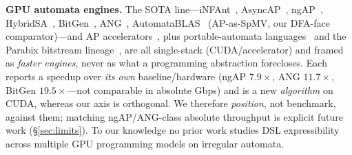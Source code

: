 \documentclass[conference]{IEEEtran}
\begin{document}
\textbf{GPU automata engines.} The SOTA line---iNFAnt~\cite{infant}, AsyncAP~\cite{asyncap},
ngAP~\cite{ngap}, HybridSA~\cite{hybridsa}, BitGen~\cite{bitgen}, ANG~\cite{ang},
AutomataBLAS~\cite{automatablas} (AP-as-SpMV, our DFA-face comparator)---and AP
accelerators~\cite{hopps}, plus portable-automata languages~\cite{rapid} and the Parabix
bitstream lineage~\cite{parabix}, are all single-stack (CUDA/accelerator) and framed as
\emph{faster engines}, never as what a programming abstraction forecloses. Each reports a
speedup over \emph{its own} baseline/hardware (ngAP $7.9\times$, ANG $11.7\times$, BitGen
$19.5\times$---not comparable in absolute Gbps) and is a new \emph{algorithm} on CUDA, whereas
our axis is orthogonal. We therefore \emph{position}, not benchmark, against them; matching
ngAP/ANG-class absolute throughput is explicit future work (\S\ref{sec:limits}). To our
knowledge no prior work studies DSL expressibility across multiple GPU programming models on
irregular automata.
\end{document}
